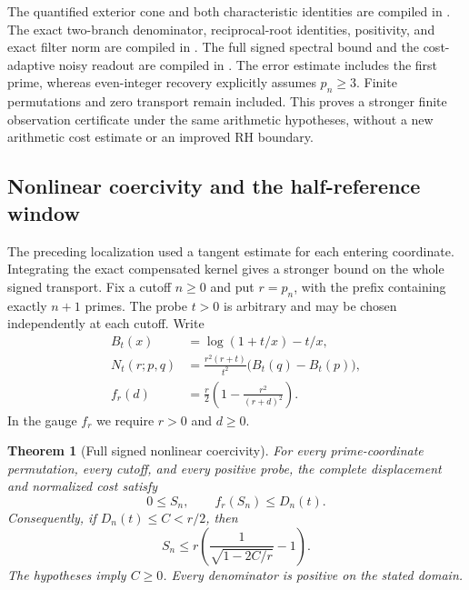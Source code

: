 \documentclass[11pt]{article}
\newtheorem{theorem}{Theorem}[section]
\theoremstyle{definition}
\begin{document}
\begin{flushleft}
The quantified exterior cone and both characteristic identities are
compiled in
.
The exact two-branch denominator, reciprocal-root identities, positivity,
and exact filter norm are compiled in
.
The full signed spectral bound and the cost-adaptive noisy readout are
compiled in
.
The error estimate includes the first prime, whereas even-integer recovery
explicitly assumes $p_n\ge3$. Finite permutations and zero transport remain
included. This proves a stronger finite observation certificate under the
same arithmetic hypotheses, without a new arithmetic cost estimate or
an improved RH boundary.
\end{flushleft}

\subsection{Nonlinear coercivity and the half-reference window}

The preceding localization used a tangent estimate for each entering
coordinate. Integrating the exact compensated kernel gives a stronger
bound on the whole signed transport. Fix a cutoff $n\ge0$ and put
$r=p_n$, with the prefix containing exactly $n+1$ primes. The probe
$t>0$ is arbitrary and may be chosen independently at each cutoff.
Write
\[
 \begin{split}
 B_t(x)&=\log(1+t/x)-t/x,\\
 N_t(r;p,q)&=\frac{r^2(r+t)}{t^2}\bigl(B_t(q)-B_t(p)\bigr),\\
 f_r(d)&=\frac r2\left(1-\frac{r^2}{(r+d)^2}\right).
 \end{split}
\]
In the gauge $f_r$ we require $r>0$ and $d\ge0$.

\begin{theorem}[Full signed nonlinear coercivity]
For every prime-coordinate permutation, every cutoff, and every
positive probe, the complete displacement and normalized cost satisfy
\[
 0\le S_n,\qquad
 f_r(S_n)\le D_n(t).
\]
Consequently, if $D_n(t)\le C<r/2$, then
\[
 S_n\le r\left(\frac1{\sqrt{1-2C/r}}-1\right).
\]
The hypotheses imply $C\ge0$. Every denominator is positive on the
stated domain.
\end{theorem}
\end{document}
